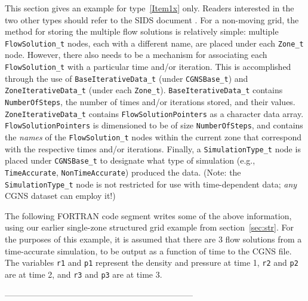 \documentclass[12pt]{article}
\begin{document}
This section gives an example for type~\ref{Item1x} only.  Readers interested
in the two other types should refer to the SIDS document \cite{ALLMARAS}.
For a non-moving grid, the method for storing the multiple flow solutions is relatively simple:
multiple {\tt FlowSolution\_t} nodes,
each with a different name, are placed under each {\tt Zone\_t} node.
However, there also needs to be a mechanism for associating each
{\tt FlowSolution\_t} with a particular time and/or iteration.  This
is accomplished through the use of {\tt BaseIterativeData\_t} (under
{\tt CGNSBase\_t}) and {\tt ZoneIterativeData\_t} (under each {\tt Zone\_t}).
{\tt BaseIterativeData\_t} contains {\tt NumberOfSteps}, the number of times and/or iterations
stored, and their values.  {\tt ZoneIterativeData\_t} contains
{\tt FlowSolutionPointers} as a character data array.  {\tt FlowSolutionPointers}
is dimensioned to be of size {\tt NumberOfSteps}, and contains the {\it names}
of the {\tt FlowSolution\_t} nodes within the current zone that correspond
with the respective times and/or iterations.  Finally, a
{\tt SimulationType\_t} node is placed under {\tt CGNSBase\_t} to
designate what type of simulation (e.g., {\tt TimeAccurate}, {\tt NonTimeAccurate})
produced the data.  (Note:  the {\tt SimulationType\_t} node is not restricted
for use with time-dependent data; {\it any} CGNS dataset can employ it!)

The following FORTRAN code segment writes some of 
the above information, using our
earlier single-zone structured
grid example from section~\ref{sec:str}.  For the purposes of this example,
it is assumed that there are 3 flow solutions from a time-accurate
simulation, to be output as a function of time to the CGNS file.
The variables {\tt r1} and {\tt p1} represent the density and pressure
at time 1, {\tt r2} and {\tt p2} are at time 2, and {\tt r3} and {\tt p3}
are at time 3.

--------------------------------------------------------------------
\end{document}

